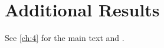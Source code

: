 \chapter{Additional Results}\label{app:B}
\lipsum[19-20]

See \cref{ch:4} for the main text and \citep{appx-1}.
